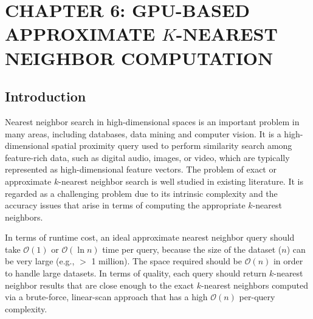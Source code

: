 \chapter[GPU-BASED APPROXIMATE $K$-NEAREST NEIGHBOR COMPUTATION]{CHAPTER 6: GPU-BASED APPROXIMATE $K$-NEAREST NEIGHBOR  COMPUTATION} 
\label{chp:GLSH}

\section{Introduction}
Nearest neighbor search in high-dimensional spaces is an important problem in many areas, including databases, data mining and computer vision. It is a high-dimensional spatial proximity query used to perform similarity search among feature-rich data, such as digital audio, images, or video, which are typically represented as high-dimensional feature vectors. The problem of exact or approximate $k$-nearest neighbor search is well studied in existing literature. It is regarded as a challenging problem due to its intrinsic complexity and the accuracy issues that arise in terms of computing the appropriate $k$-nearest neighbors.

In terms of runtime cost, an ideal approximate nearest neighbor query should take $\mathcal O(1)$ or $\mathcal O(\ln n)$ time per query, because the size of the dataset ($n$) can be very large (e.g., $>$ 1 million). The space required should be $\mathcal O(n)$ in order to handle large datasets. In terms of quality, each query should return $k$-nearest neighbor results that are close enough to the exact $k$-nearest neighbors computed via a brute-force, linear-scan approach that has a high $\mathcal O(n)$ per-query complexity.

